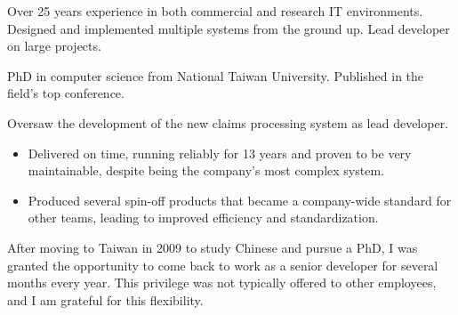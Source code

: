 \documentclass[10pt,a4paper]{../altacv}
\begin{document}

\begin{fullwidth}
\makecvheader

Over 25 years experience in both commercial and research IT environments. Designed and implemented multiple systems from the ground up. Lead developer on large projects.

PhD in computer science from National Taiwan University. Published in the field’s top conference. 

\end{fullwidth}

\small



Oversaw the development of the new claims processing system as lead developer.

\medskip

\begin{itemize}
	\item Delivered on time, running reliably for 13 years and proven to be very maintainable, despite being the company's most complex system.
	\item Produced several spin-off products that became a company-wide standard for other teams, leading to improved efficiency and standardization.
\end{itemize}

\medskip

After moving to Taiwan in 2009 to study Chinese and pursue a PhD, I was granted the opportunity to come back to work as a senior developer for several months every year. This privilege was not typically offered to other employees, and I am grateful for this flexibility.
\end{document}
